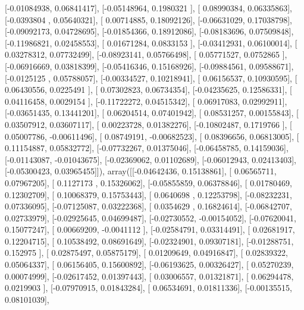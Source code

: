 \documentclass{article}
\begin{document}
       [-0.01084938,  0.06841417],
       [-0.05148964,  0.1980321 ],
       [ 0.08990384,  0.06335863],
       [-0.0393804 ,  0.05640321],
       [ 0.00714885,  0.18092126],
       [-0.06631029,  0.17038798],
       [-0.09092173,  0.04728695],
       [-0.01854366,  0.18912086],
       [-0.08183696,  0.07509848],
       [-0.11986821,  0.02458553],
       [ 0.01671284,  0.0833153 ],
       [-0.03412931,  0.06100014],
       [ 0.03278312,  0.07732499],
       [-0.08923141,  0.05766498],
       [ 0.05771527,  0.0752865 ],
       [-0.06916669,  0.03818399],
       [-0.05416346,  0.15168926],
       [-0.09884561,  0.09588671],
       [-0.0125125 ,  0.05788057],
       [-0.00334527,  0.10218941],
       [ 0.06156537,  0.10930595],
       [ 0.06430556,  0.0225491 ],
       [ 0.07302823,  0.06734354],
       [-0.04235625,  0.12586331],
       [ 0.04116458,  0.0029154 ],
       [-0.11722272,  0.04515342],
       [ 0.06917083,  0.02992911],
       [-0.03651435,  0.13441201],
       [ 0.06204514,  0.07401942],
       [ 0.08531257,  0.00155843],
       [ 0.03507912,  0.03607117],
       [ 0.00223728,  0.01382276],
       [-0.10802487,  0.1719766 ],
       [ 0.05007786, -0.00611496],
       [ 0.08749191, -0.00682523],
       [ 0.08396656,  0.06813005],
       [ 0.11154887,  0.05832772],
       [-0.07732267,  0.01375046],
       [-0.06458785,  0.14159036],
       [-0.01143087, -0.01043675],
       [-0.02369062,  0.01102689],
       [-0.06012943,  0.02413403],
       [-0.05300423,  0.03965455]]), array([[-0.04642436,  0.15138861],
       [ 0.06565711,  0.07967205],
       [ 0.1127173 ,  0.15326062],
       [-0.05855859,  0.06378846],
       [ 0.01780469,  0.12302709],
       [ 0.10068379,  0.15753443],
       [ 0.0640698 ,  0.12253798],
       [-0.08232231,  0.07336095],
       [-0.07125087,  0.03222368],
       [ 0.0354629 ,  0.16824614],
       [-0.06842707,  0.02733979],
       [-0.02925645,  0.04699487],
       [-0.02730552, -0.00154052],
       [-0.07620041,  0.15077247],
       [ 0.00669209, -0.0041112 ],
       [-0.02584791,  0.03314491],
       [ 0.02681917,  0.12204715],
       [ 0.10538492,  0.08691649],
       [-0.02324901,  0.09307181],
       [-0.01288751,  0.152975  ],
       [ 0.02875497,  0.05875179],
       [ 0.01209649,  0.04916847],
       [ 0.02839322,  0.05064337],
       [ 0.06156405,  0.15600892],
       [-0.06193625,  0.00326427],
       [ 0.05270239,  0.00074999],
       [-0.02617452,  0.01397443],
       [ 0.03006557,  0.01321871],
       [ 0.06294478,  0.0219903 ],
       [-0.07970915,  0.01843284],
       [ 0.06534691,  0.01811336],
       [-0.00135515,  0.08101039],
\end{document}
